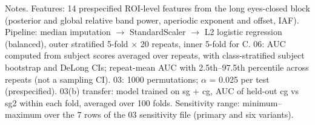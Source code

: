 \begin{table}[htbp]
\centering
\caption{[CAPTION]}
\label{tab:Table4}
\footnotesize
{}
\par\smallskip
\begin{minipage}{\textwidth}\raggedright\scriptsize
Notes. Features: 14 prespecified ROI-level features from the long eyes-closed block (posterior and global relative band power, aperiodic exponent and offset, IAF). Pipeline: median imputation $\rightarrow$ StandardScaler $\rightarrow$ L2 logistic regression (balanced), outer stratified 5-fold $\times$ 20 repeats, inner 5-fold for C. 06: AUC computed from subject scores averaged over repeats, with class-stratified subject bootstrap and DeLong CIs; repeat-mean AUC with 2.5th--97.5th percentile across repeats (not a sampling CI). 03: 1000 permutations; $\alpha$ = 0.025 per test (prespecified). 03(b) transfer: model trained on sg + cg, AUC of held-out cg vs sg2 within each fold, averaged over 100 folds. Sensitivity range: minimum--maximum over the 7 rows of the 03 sensitivity file (primary and six variants).
\end{minipage}
\end{table}
